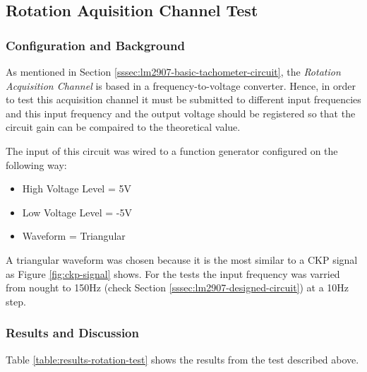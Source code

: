 \subsection{Rotation Aquisition Channel Test}\label{sec:speed-aquisition-channel-test}
	
	\subsubsection{Configuration and Background}

		As mentioned in Section \ref{sssec:lm2907-basic-tachometer-circuit}, the \textit{Rotation Acquisition Channel} is based in a frequency-to-voltage converter. Hence, in order to test this acquisition channel it must be submitted to different input frequencies and this input frequency and the output voltage should be registered so that the circuit gain can be compaired to the theoretical value.
		\par
		The input of this circuit was wired to a function generator configured on the following way:

			\begin{itemize}
				\item High Voltage Level = 5V
				\item Low Voltage Level = -5V
				\item Waveform = Triangular
			\end{itemize}
		A triangular waveform was chosen because it is the most similar to a CKP signal as Figure \ref{fig:ckp-signal} shows. For the tests the input frequency was varried from nought to 150Hz (check Section \ref{sssec:lm2907-designed-circuit}) at a 10Hz step.
		
	\subsubsection{Results and Discussion}

		Table \ref{table:results-rotation-test} shows the results from the test described above.

